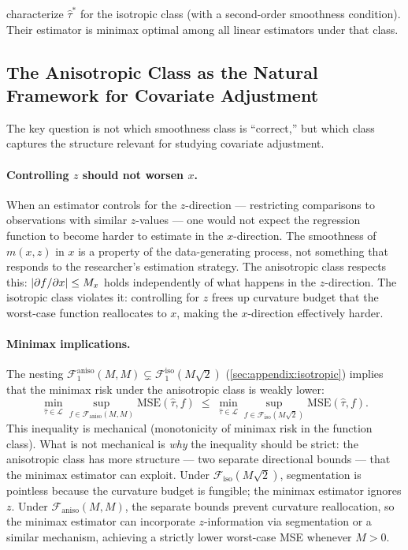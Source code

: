 \textcite{imbens_optimized_2019} characterize $\hat\tau^*$ for the isotropic class (with a second-order smoothness condition).
Their estimator is minimax optimal among all linear estimators under that class.


\subsection*{The Anisotropic Class as the Natural Framework for Covariate Adjustment}

The key question is not which smoothness class is ``correct,'' but which class captures the structure relevant for studying covariate adjustment.

\paragraph{Controlling $z$ should not worsen $x$.}
When an estimator controls for the $z$-direction --- restricting comparisons to observations with similar $z$-values --- one would not expect the regression function to become harder to estimate in the $x$-direction.
The smoothness of $m(x,z)$ in $x$ is a property of the data-generating process, not something that responds to the researcher's estimation strategy.
The anisotropic class respects this: $\lvert\partial f / \partial x\rvert \leq M_x$ holds independently of what happens in the $z$-direction.
The isotropic class violates it: controlling for $z$ frees up curvature budget that the worst-case function reallocates to $x$, making the $x$-direction effectively harder.

\paragraph{Minimax implications.}
The nesting $\mathcal{F}_1^{\mathrm{aniso}}(M, M) \subsetneq \mathcal{F}_1^{\mathrm{iso}}(M\sqrt{2})$ (\cref{sec:appendix:isotropic}) implies that the minimax risk under the anisotropic class is weakly lower:
\begin{equation}\label{eq:minimax_comparison}
	\min_{\hat\tau \in \mathcal{L}} \sup_{f \in \mathcal{F}_{\mathrm{aniso}}(M, M)} \mathrm{MSE}(\hat\tau, f) \;\leq\; \min_{\hat\tau \in \mathcal{L}} \sup_{f \in \mathcal{F}_{\mathrm{iso}}(M\sqrt{2})} \mathrm{MSE}(\hat\tau, f).
\end{equation}
This inequality is mechanical (monotonicity of minimax risk in the function class).
What is not mechanical is \emph{why} the inequality should be strict: the anisotropic class has more structure --- two separate directional bounds --- that the minimax estimator can exploit.
Under $\mathcal{F}_{\mathrm{iso}}(M\sqrt{2})$, segmentation is pointless because the curvature budget is fungible; the minimax estimator ignores $z$.
Under $\mathcal{F}_{\mathrm{aniso}}(M, M)$, the separate bounds prevent curvature reallocation, so the minimax estimator can incorporate $z$-information via segmentation or a similar mechanism, achieving a strictly lower worst-case MSE whenever $M > 0$.

